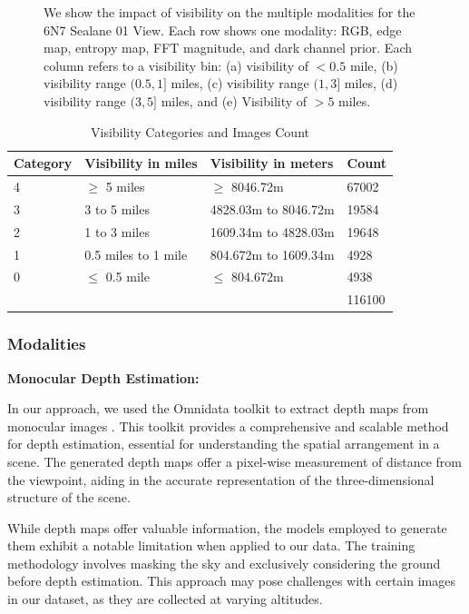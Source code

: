 \begin{figure}
  \caption{We show the impact of visibility on the multiple modalities for the 6N7 Sealane 01 View. Each row shows one modality: RGB, edge map, entropy map, FFT magnitude, and dark channel prior. Each column refers to a visibility bin: (a) visibility of $< 0.5$ mile, (b) visibility range $(0.5, 1]$ miles, (c) visibility range $(1, 3]$ miles, (d) visibility range $(3, 5]$ miles, and (e) Visibility of $> 5$ miles. }
  \label{fig:impact_vis_deg_features}
\end{figure}


\begin{table}[htbp]
\centering
\caption{Visibility Categories and Images Count}
\label{tab:vis_img_count}
\begin{tabular}{|l|l|l|l|}
\hline
Category & Visibility in miles  & Visibility in meters & Count  \\ \hline
4        & $\geq$ 5 miles             &     $\geq$ 8046.72m                 & 67002  \\ \hline
3        & 3 to 5 miles         &      4828.03m to  8046.72m        & 19584  \\ \hline
2        & 1 to 3 miles         &            1609.34m to 4828.03m         & 19648  \\ \hline
1        & 0.5 miles to 1 mile  &               804.672m to 1609.34m      & 4928  \\ \hline
0        & $\leq$ 0.5 mile   &     $\leq$ 804.672m                 & 4938  \\ \hline
        &    &                      &  116100  \\ \hline
\end{tabular}
\end{table}


\subsubsection{Modalities}
\label{modalities}
\textbf{Monocular Depth Estimation:}

In our approach, we used the Omnidata toolkit to extract depth maps from monocular images \cite{eftekhar2021omnidata, ranftl2021vision}. This toolkit provides a comprehensive and scalable method for depth estimation, essential for understanding the spatial arrangement in a scene. The generated depth maps offer a pixel-wise measurement of distance from the viewpoint, aiding in the accurate representation of the three-dimensional structure of the scene. 

While depth maps offer valuable information, the models employed to generate them exhibit a notable limitation when applied to our data. The training methodology involves masking the sky and exclusively considering the ground before depth estimation. This approach may pose challenges with certain images in our dataset, as they are collected at varying altitudes.

